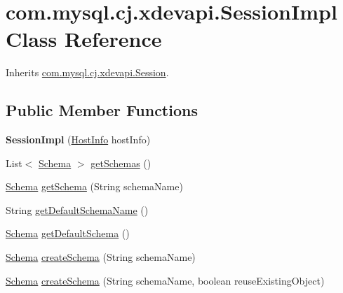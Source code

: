 \hypertarget{classcom_1_1mysql_1_1cj_1_1xdevapi_1_1_session_impl}{}\section{com.\+mysql.\+cj.\+xdevapi.\+Session\+Impl Class Reference}
\label{classcom_1_1mysql_1_1cj_1_1xdevapi_1_1_session_impl}


Inherits \mbox{\hyperlink{interfacecom_1_1mysql_1_1cj_1_1xdevapi_1_1_session}{com.\+mysql.\+cj.\+xdevapi.\+Session}}.

\subsection*{Public Member Functions}
\begin{DoxyCompactItemize}
\item 
\mbox{\label{classcom_1_1mysql_1_1cj_1_1xdevapi_1_1_session_impl_accebe952a26b96f742b99bdbcfcd27f7}} 
{\bfseries Session\+Impl} (\mbox{\hyperlink{classcom_1_1mysql_1_1cj_1_1conf_1_1_host_info}{Host\+Info}} host\+Info)
\item 
List$<$ \mbox{\hyperlink{interfacecom_1_1mysql_1_1cj_1_1xdevapi_1_1_schema}{Schema}} $>$ \mbox{\hyperlink{classcom_1_1mysql_1_1cj_1_1xdevapi_1_1_session_impl_a2d607f33ef3231038642b5836b813531}{get\+Schemas}} ()
\item 
\mbox{\hyperlink{interfacecom_1_1mysql_1_1cj_1_1xdevapi_1_1_schema}{Schema}} \mbox{\hyperlink{classcom_1_1mysql_1_1cj_1_1xdevapi_1_1_session_impl_aeb00f17f0c469af51f790c4a73666904}{get\+Schema}} (String schema\+Name)
\item 
String \mbox{\hyperlink{classcom_1_1mysql_1_1cj_1_1xdevapi_1_1_session_impl_a4aa237ed5d2cfe61c302a11907533b61}{get\+Default\+Schema\+Name}} ()
\item 
\mbox{\hyperlink{interfacecom_1_1mysql_1_1cj_1_1xdevapi_1_1_schema}{Schema}} \mbox{\hyperlink{classcom_1_1mysql_1_1cj_1_1xdevapi_1_1_session_impl_adba641099e94d53a50b08abc745d761b}{get\+Default\+Schema}} ()
\item 
\mbox{\hyperlink{interfacecom_1_1mysql_1_1cj_1_1xdevapi_1_1_schema}{Schema}} \mbox{\hyperlink{classcom_1_1mysql_1_1cj_1_1xdevapi_1_1_session_impl_a21dd320f0e162d26784465aa6bb859ce}{create\+Schema}} (String schema\+Name)
\item 
\mbox{\hyperlink{interfacecom_1_1mysql_1_1cj_1_1xdevapi_1_1_schema}{Schema}} \mbox{\hyperlink{classcom_1_1mysql_1_1cj_1_1xdevapi_1_1_session_impl_ae98234f9b7a73f758946297806aeb639}{create\+Schema}} (String schema\+Name, boolean reuse\+Existing\+Object)

\end{DoxyCompactItemize}
